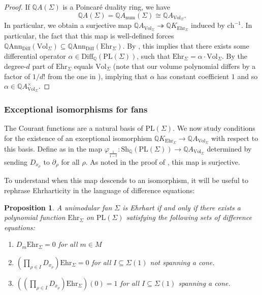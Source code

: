 \documentclass[oneside]{amsart}
\theoremstyle{plain}
\newtheorem{proposition}[theorem]{Proposition}
\theoremstyle{definition}
\newcommand{\Q}{{\mathbb{Q}}}
\newcommand{\Ann}{{\mathrm{Ann}}}
\newcommand{\Diff}{{\mathrm{Diff}}}
\newcommand{\Vol}{{\mathrm{Vol}}}
\newcommand{\Ehr}{{\mathrm{Ehr}}}
\newcommand{\Sh}{{\mathrm{Sh}}}
\newcommand{\ch}{{\mathrm{ch}}}
\newcommand{\PL}{{\mathrm{PL}}}
\newcommand{\num}{{\mathrm{num}}}
\begin{document}
\begin{proof}
If $\Q A(\Sigma)$ is a Poincaré duality ring, we have 
\[
    \Q A(\Sigma)=\Q A_\num(\Sigma)\cong \Q A_{\Vol_\Sigma}.
\]
In particular, we obtain a surjective map $\Q A_{\Vol_\Sigma} \twoheadrightarrow \Q K_{\Ehr_\Sigma}$ induced by $\ch^{-1}$. In particular, the fact that this map is well-defined forces $\Q \Ann_\Diff(\Vol_\Sigma) \subseteq \Q \Ann_\Diff(\Ehr_\Sigma)$.
By , this implies that
there exists some differential operator $\alpha \in \Diff_\Q(\PL(\Sigma))$, such that
$\Ehr_\Sigma = \alpha \cdot \Vol_\Sigma$.
By \cite[Proposition 3.13]{EhrhartFans} the degree-$d$ part of $\Ehr_\Sigma$ equals $\Vol_\Sigma$ (note that our volume polynomial differs by a factor of $1/d!$ from the one in \cite{EhrhartFans}), implying that $\alpha$ has constant coefficient $1$ and so  $\alpha \in \Q A_{\Vol_\Sigma}^\times$.
\end{proof}



\subsubsection{Exceptional isomorphisms for fans}


The Courant functions are a natural basis of $\PL(\Sigma)$.
We now study conditions for the existence of an exceptional isomorphism
$\Q K_{\Ehr_\Sigma}\to \Q A_{\Vol_\Sigma}$ with respect to this basis.
Define as in  the map $\varphi_{\frac{1}{1 - t}}: \Sh_\Q(\PL(\Sigma)) \to \Q A_{\Vol_\Sigma}$ determined by sending $D_{x_\rho}$ to $\partial_{\rho}$ for all $\rho$. As noted in the proof of , this map is surjective. 

 
To understand when this map descends to an isomorphism, it will be useful to rephrase Ehrharticity in the language of difference equations:

\begin{proposition}
\label{prop:IVP for Ehrharticity}
A unimodular fan $\Sigma$ is Ehrhart if and only if there exists a polynomial function $\Ehr_\Sigma$ on $\PL(\Sigma)$ satisfying the following sets of difference equations:

\begin{enumerate}[label=(\roman*)]
\item 
$D_m\Ehr_\Sigma=0$ \quad for all $m\in M$
\item
$\left(\prod_{\rho\in I} D_{x_\rho} \right)\Ehr_\Sigma =0$ \quad for all $I\subseteq\Sigma(1)$
not spanning a cone.
\item
$\left(\left(\prod_{\rho\in I} D_{x_\rho}\right) \Ehr_\Sigma\right)(0) =1$ \quad for all $I\subseteq\Sigma(1)$ spanning a cone.
\end{enumerate}
\end{proposition}
\end{document}
